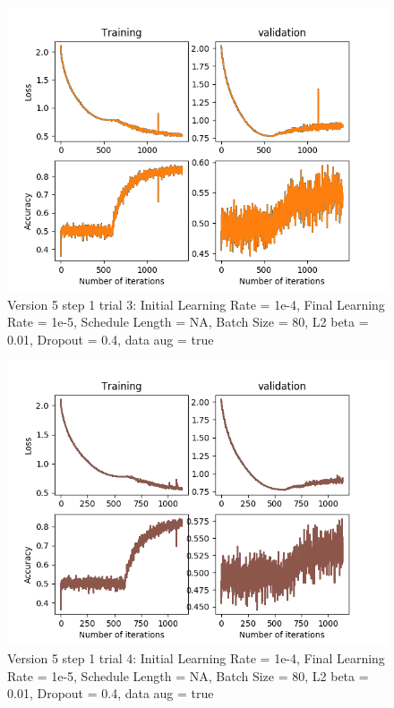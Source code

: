 \documentclass[12pt,reqno]{amsart}
\numberwithin{equation}{section}
\begin{document}
\begin{enumerate}
\begin{figure}[H]
\centering
\includegraphics[scale=0.6]{data12_version5_step1_trial3}
\caption{Version 5 step 1 trial 3: Initial Learning Rate = 1e-4, Final Learning Rate = 1e-5, Schedule Length = NA, Batch Size = 80, L2 beta = 0.01, Dropout = 0.4, data aug = true}
\end{figure}

\begin{figure}[H]
\centering
\includegraphics[scale=0.6]{data12_version5_step1_trial4}
\caption{Version 5 step 1 trial 4: Initial Learning Rate = 1e-4, Final Learning Rate = 1e-5, Schedule Length = NA, Batch Size = 80, L2 beta = 0.01, Dropout = 0.4, data aug = true}
\end{figure}


\end{enumerate}
\end{document}
